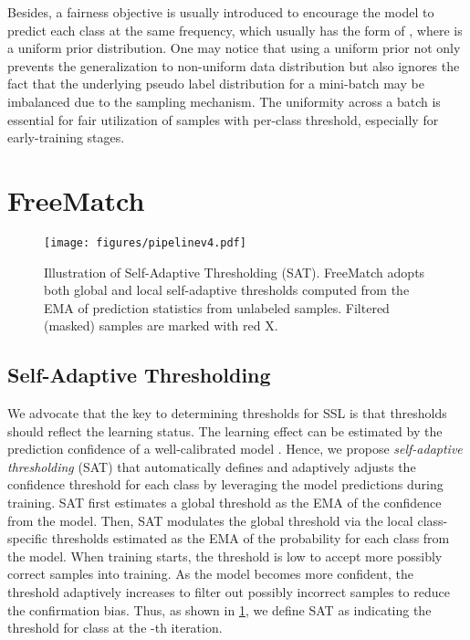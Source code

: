 \documentclass{article} \usepackage{iclr2023_conference,times}
\theoremstyle{plain}
\theoremstyle{definition}
\theoremstyle{remark}
\newcommand{\ourmethod}{FreeMatch\xspace}
\begin{document}
Besides, a fairness objective  is usually introduced to encourage the model to predict each class at the same frequency, which usually has the form of  \citep{krause2010disc}, where  is a uniform prior distribution. One may notice that using a uniform prior not only prevents the generalization to non-uniform data distribution but also ignores the fact that the underlying pseudo label distribution for a mini-batch may be imbalanced due to the sampling mechanism. The uniformity across a batch is essential for fair utilization of samples with per-class threshold, especially for early-training stages.



\section{FreeMatch}

\begin{figure}[!t]
    \centering
    \texttt{[image: figures/pipelinev4.pdf]}
    \caption{Illustration of Self-Adaptive Thresholding (SAT). \ourmethod adopts both global and local self-adaptive thresholds computed from the EMA of prediction statistics from unlabeled samples. Filtered (masked) samples are marked with red X.
    }
    \label{fig:pipeline}
    \vspace{-.1in}
\end{figure}

\subsection{Self-Adaptive Thresholding}

We advocate that the key to determining thresholds for SSL is that thresholds should reflect the learning status.
The learning effect can be estimated by the prediction confidence of a well-calibrated model \citep{guo2017calibration}.
Hence, we propose \textit{self-adaptive thresholding} (SAT) that automatically defines and adaptively adjusts the confidence threshold for each class by leveraging the model predictions during training.
SAT first estimates a global threshold as the EMA of the confidence from the model.
Then, SAT modulates the global threshold via the local class-specific thresholds estimated as the EMA of the probability for each class from the model.
When training starts, the threshold is low to accept more possibly correct samples into training.
As the model becomes more confident, the threshold adaptively increases to filter out possibly incorrect samples to reduce the confirmation bias.
Thus, as shown in \cref{fig:pipeline}, we define SAT as  indicating the threshold for class  at the -th iteration. 
\end{document}
